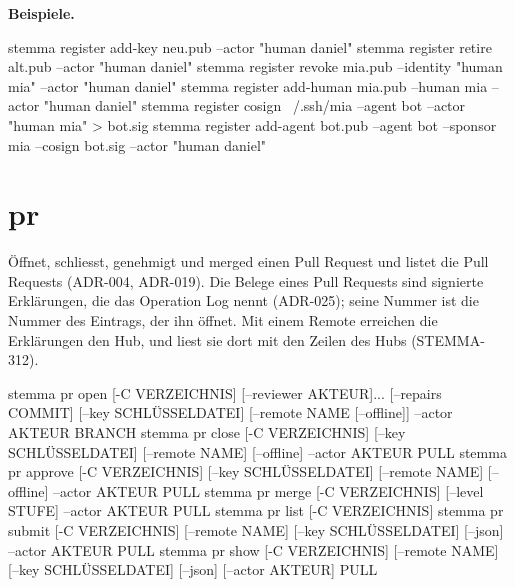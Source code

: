 {\bf Beispiele.}

\starttyping
stemma register add-key neu.pub --actor "human daniel"
stemma register retire alt.pub --actor "human daniel"
stemma register revoke mia.pub --identity "human mia" --actor "human daniel"
stemma register add-human mia.pub --human mia --actor "human daniel"
stemma register cosign ~/.ssh/mia --agent bot --actor "human mia" > bot.sig
stemma register add-agent bot.pub --agent bot --sponsor mia --cosign bot.sig --actor "human daniel"
\stoptyping

\section{pr}

Öffnet, schliesst, genehmigt und merged einen Pull Request und listet die Pull Requests
(ADR-004, ADR-019). Die Belege eines Pull Requests sind signierte Erklärungen, die das Operation
Log nennt (ADR-025); seine Nummer ist die Nummer des Eintrags, der ihn öffnet.
Mit einem Remote erreichen die Erklärungen den Hub, und  liest sie dort mit den
Zeilen des Hubs (STEMMA-312).

\starttyping
stemma pr open [-C VERZEICHNIS] [--reviewer AKTEUR]... [--repairs COMMIT]
        [--key SCHLÜSSELDATEI] [--remote NAME [--offline]] --actor AKTEUR BRANCH
stemma pr close [-C VERZEICHNIS] [--key SCHLÜSSELDATEI] [--remote NAME] [--offline]
        --actor AKTEUR PULL
stemma pr approve [-C VERZEICHNIS] [--key SCHLÜSSELDATEI] [--remote NAME] [--offline]
        --actor AKTEUR PULL
stemma pr merge [-C VERZEICHNIS] [--level STUFE] --actor AKTEUR PULL
stemma pr list [-C VERZEICHNIS]
stemma pr submit [-C VERZEICHNIS] [--remote NAME] [--key SCHLÜSSELDATEI] [--json]
        --actor AKTEUR PULL
stemma pr show [-C VERZEICHNIS] [--remote NAME] [--key SCHLÜSSELDATEI] [--json]
        [--actor AKTEUR] PULL
\stoptyping

